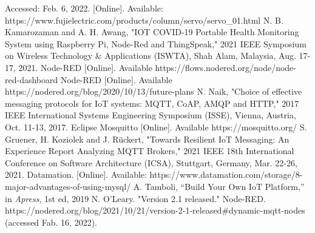 \documentclass[conference]{IEEEtran}
\begin{document}
\begin{thebibliography}{00}
Accessed: Feb. 6, 2022. [Online]. Available: https://www.fujielectric.com/products/column/servo/servo\_01.html
N. B. Kamarozaman and A. H. Awang, "IOT COVID-19 Portable Health Monitoring System using Raspberry Pi, Node-Red and ThingSpeak," 2021 IEEE Symposium on Wireless Technology \& Applications (ISWTA), Shah Alam, Malaysia, Aug. 17-17, 2021.
Node-RED [Online]. Available https://flows.nodered.org/node/node-red-dashboard
Node-RED [Online]. Available https://nodered.org/blog/2020/10/13/future-plans
N. Naik, "Choice of effective messaging protocols for IoT systems: MQTT, CoAP, AMQP and HTTP," 2017 IEEE International Systems Engineering Symposium (ISSE), Vienna, Austria, Oct. 11-13, 2017.
Eclipse Mosquitto [Online]. Available https://mosquitto.org/
S. Gruener, H. Koziolek and J. Rückert, "Towards Resilient IoT Messaging: An Experience Report Analyzing MQTT Brokers," 2021 IEEE 18th International Conference on Software Architecture (ICSA), Stuttgart, Germany, Mar. 22-26, 2021.
Datamation. [Online]. Available: https://www.datamation.com/storage/8-major-advantages-of-using-mysql/
A. Tamboli, “Build Your Own IoT Platform,” in \textit{Apress}, 1st ed, 2019
N. O'Leary. "Version 2.1 released." Node-RED. https://nodered.org/blog/2021/10/21/version-2-1-released\#dynamic-mqtt-nodes (accessed Fab. 16, 2022).

\end{thebibliography}
\vspace{12pt}
\end{document}
